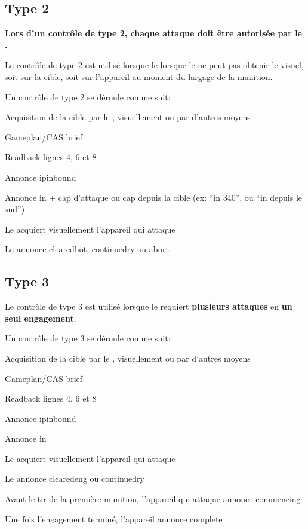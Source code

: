 \subsection{Type 2}
\e
    \item \textbf{Lors d'un contrôle de type 2, chaque attaque doit être autorisée par le \ja{}.}
    \item Le contrôle de type 2 est utilisé lorsque le \ja{} lorsque le \ja{} ne peut pas obtenir le visuel, soit sur la cible, soit sur l'appareil au moment du largage de la munition.
    \item Un contrôle de type 2 se déroule comme suit:
    \ee
        \item Acquisition de la cible par le \ja{}, visuellement ou par d'autres moyens
        \item Gameplan/CAS brief
        \item Readback lignes 4, 6 et 8
        \item Annonce \acrshort{ipinbound}
        \item Annonce \acrshort{in} + cap d'attaque ou cap depuis la cible (ex: ``\acrshort{in} 340'', ou ``\acrshort{in} depuis le sud'')
        \item Le \ja{} acquiert visuellement l'appareil qui attaque
        \item Le \ja{} annonce \acrshort{clearedhot}, \acrshort{continuedry} ou \acrshort{abort}
    \ed
\ed

\subsection{Type 3}
\e
    \item Le contrôle de type 3 est utilisé lorsque le \ja{} requiert \textbf{plusieurs attaques} en \textbf{un seul engagement}.
    \item Un contrôle de type 3 se déroule comme suit:
    \ee
        \item Acquisition de la cible par le \ja{}, visuellement ou par d'autres moyens
        \item Gameplan/CAS brief
        \item Readback lignes 4, 6 et 8
        \item Annonce \acrshort{ipinbound}
        \item Annonce \acrshort{in}
        \item Le \ja{} acquiert visuellement l'appareil qui attaque
        \item Le \ja{} annonce \acrshort{clearedeng} ou \acrshort{continuedry}
        \item Avant le tir de la première munition, l'appareil qui attaque annonce \acrshort{commencing}
        \item Une fois l'engagement terminé, l'appareil annonce \acrshort{complete}
    \ed
\ed


